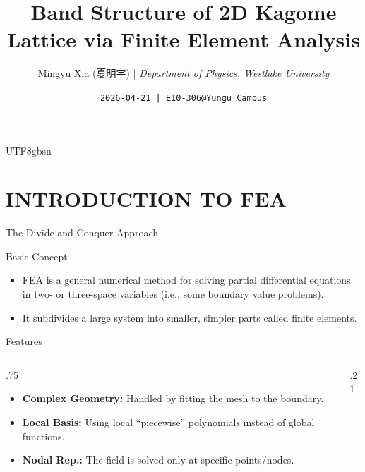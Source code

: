 \documentclass[svgnames, aspectratio = 1610]{beamer}
\title[Final Project Presentation]%
  {Band Structure of 2D Kagome Lattice via Finite Element Analysis}
\author[Mingyu Xia]{\texorpdfstring{Mingyu Xia (夏明宇) |
                    \textit{Department of Physics, Westlake University}}
                      {Mingyu Xia}}
\date{\texttt{2026-04-21 | E10-306@Yungu Campus}}
\let\cite=\supercite
\begin{document}
\begin{CJK*}{UTF8}{gbsn}
\maketitle
\end{CJK*}

\section{INTRODUCTION TO FEA}

\begin{frame}{The Divide and Conquer Approach}
  \begin{alertblock}{Basic Concept\cite{fea_wiki}}
    \begin{itemize}[<+->]
      \item FEA is a general numerical method for solving partial differential
      equations in two- or three-space variables (i.e., some boundary value
      problems).
      \item It subdivides a large system into smaller, simpler parts called
      \alert{finite elements}.
    \end{itemize}
  \end{alertblock}
  \pause
  \begin{exampleblock}{Features}
    \vskip-6pt
    \begin{columns}
      \begin{column}{.75\linewidth}
        \begin{itemize}[<+->]
          \item \textbf{Complex Geometry:} Handled by fitting the mesh to the boundary.
          \item \textbf{Local Basis:} Using local ``piecewise'' polynomials
          instead of global functions.
          \item \textbf{Nodal Rep.:} The field is solved only
          at specific points/nodes.
        \end{itemize}
      \end{column}
      \hfill
      \begin{column}{.21\linewidth}
        \centering
        \begin{tikzpicture}

\end{tikzpicture}
\end{column}
\end{columns}
\end{exampleblock}
\end{frame}
\end{document}
